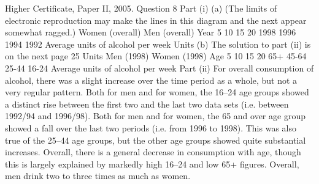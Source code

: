 Higher Certificate, Paper II, 2005. Question 8
Part (i)
(a)
(The limits of electronic reproduction may make the lines in this diagram and the next appear somewhat ragged.)
Women (overall)
Men (overall)
Year
5
10
15
20
1998
1996
1994
1992
Average units of alcohol per week
Units
(b)
The solution to part (ii) is on the next page
25
Units
Men (1998)
Women (1998)
Age
5
10
15
20
65+
45-64
25-44
16-24
Average units of alcohol per week
Part (ii)
For overall consumption of alcohol, there was a slight increase over the time period as a whole, but not a very regular pattern.
Both for men and for women, the 16–24 age groups showed a distinct rise between the first two and the last two data sets (i.e. between 1992/94 and 1996/98).
Both for men and for women, the 65 and over age group showed a fall over the last two periods (i.e. from 1996 to 1998). This was also true of the 25–44 age groups, but the other age groups showed quite substantial increases.
Overall, there is a general decrease in consumption with age, though this is largely explained by markedly high 16–24 and low 65+ figures.
Overall, men drink two to three times as much as women.